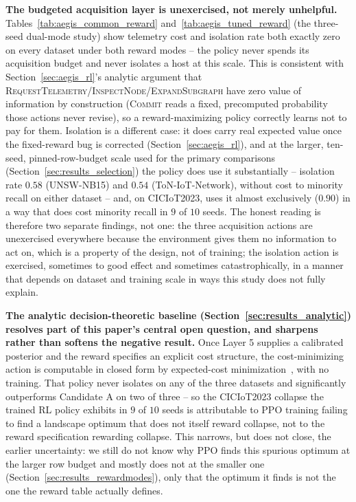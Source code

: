 \documentclass[journal]{IEEEtran}
\begin{document}
\textbf{The budgeted acquisition layer is unexercised, not merely
unhelpful.} Tables~\ref{tab:aegis_common_reward} and~\ref{tab:aegis_tuned_reward}
(the three-seed dual-mode study) show telemetry cost and isolation rate both
exactly zero on every dataset under both reward modes -- the policy never
spends its acquisition budget and never isolates a host at this scale. This
is consistent with Section~\ref{sec:aegis_rl}'s analytic argument that
\textsc{RequestTelemetry}/\textsc{InspectNode}/\textsc{ExpandSubgraph} have
zero value of information by construction (\textsc{Commit} reads a fixed,
precomputed probability those actions never revise), so a
reward-maximizing policy correctly learns not to pay for them. Isolation is
a different case: it does carry real expected value once the fixed-reward
bug is corrected (Section~\ref{sec:aegis_rl}), and at the larger, ten-seed,
pinned-row-budget scale used for the primary comparisons
(Section~\ref{sec:results_selection}) the policy does use it substantially
-- isolation rate $0.58$ (UNSW-NB15) and $0.54$ (ToN-IoT-Network), without
cost to minority recall on either dataset -- and, on CICIoT2023, uses it
almost exclusively ($0.90$) in a way that does cost minority recall in $9$
of $10$ seeds. The honest reading is therefore two separate findings, not
one: the three acquisition actions are unexercised everywhere because the
environment gives them no information to act on, which is a property of the
design, not of training; the isolation action is exercised, sometimes to
good effect and sometimes catastrophically, in a manner that depends on
dataset and training scale in ways this study does not fully explain.

\textbf{The analytic decision-theoretic baseline (Section~\ref{sec:results_analytic})
resolves part of this paper's central open question, and sharpens rather
than softens the negative result.} Once Layer 5 supplies a calibrated
posterior and the reward specifies an explicit cost structure, the
cost-minimizing action is computable in closed form by expected-cost
minimization~\cite{howard1966voi,wald1945sequential}, with no training. That
policy never isolates on any of the three datasets and significantly
outperforms Candidate A on two of three -- so the CICIoT2023 collapse the
trained RL policy exhibits in $9$ of $10$ seeds is attributable to PPO
training failing to find a landscape optimum that does not itself reward
collapse, not to the reward specification rewarding collapse. This narrows,
but does not close, the earlier uncertainty: we still do not know why PPO
finds this spurious optimum at the larger row budget and mostly does not at
the smaller one (Section~\ref{sec:results_rewardmodes}), only that the
optimum it finds is not the one the reward table actually defines.
\end{document}
